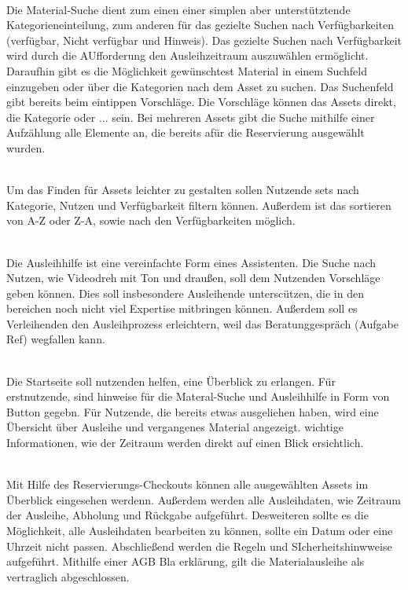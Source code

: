 {\sffamily\color{maincolor}{Ft-A-1 | Material-Suche }}\\
Die Material-Suche dient zum einen einer simplen aber unterstütztende
Kategorieneinteilung, zum anderen für das gezielte Suchen nach Verfügbarkeiten
(verfügbar, Nicht verfügbar und Hinweis). Das gezielte Suchen nach Verfügbarkeit
wird durch die AUfforderung den Ausleihzeitraum auszuwählen ermöglicht.
Daraufhin gibt es die Möglichkeit gewünschtest Material in einem Suchfeld
einzugeben oder über die Kategorien nach dem Asset zu suchen. Das Suchenfeld
gibt bereits beim eintippen Vorschläge. Die Vorschläge können das Assets direkt,
die Kategorie oder ... sein. Bei mehreren Assets gibt die Suche mithilfe einer
Aufzählung alle Elemente an, die bereits afür die Reservierung ausgewählt
wurden.

    {\sffamily\color{maincolor}{Ft-A-2 | Filtern und Sortieren }}\\
Um das Finden für Assets leichter zu gestalten sollen Nutzende sets nach
Kategorie, Nutzen und Verfügbarkeit filtern können. Außerdem ist das sortieren
von A-Z oder Z-A, sowie nach den Verfügbarkeiten möglich.

{\sffamily\color{maincolor}{Ft-A-3 | Ausleihhilfe  }}\\
Die Ausleihhilfe ist eine vereinfachte Form eines Assistenten. Die Suche nach
Nutzen, wie Videodreh mit Ton und draußen, soll dem Nutzenden Vorschläge geben
können. Dies soll insbesondere Ausleihende unterscützen, die in den bereichen
noch nicht viel Expertise mitbringen können. Außerdem soll es Verleihenden den
Ausleihprozess erleichtern, weil das Beratunggespräch (Aufgabe Ref) wegfallen
kann.

    {\sffamily\color{maincolor}{Ft-A-4 | Startseite }}\\
Die Startseite soll nutzenden helfen, eine  Überblick zu erlangen. Für
erstnutzende, sind hinweise für die Materal-Suche und Ausleihhilfe in Form von
Button gegebn. Für Nutzende, die bereits etwas ausgeliehen haben, wird eine
Übersicht über Ausleihe und vergangenes Material angezeigt. wichtige
Informationen, wie der Zeitraum werden direkt auf einen Blick ersichtlich.

    {\sffamily\color{maincolor}{Ft-A-5 | Reservierungs-Checkout }}\\
Mit Hilfe des Reservierungs-Checkouts können alle ausgewählten Assets im
Überblick eingesehen werdenn. Außerdem werden alle Ausleihdaten, wie Zeitraum
der Ausleihe, Abholung und Rückgabe aufgeführt. Desweiteren sollte es die
Möglichkeit, alle Ausleihdaten bearbeiten zu können, sollte ein Datum oder eine
Uhrzeit nicht passen. Abschließend werden die Regeln und SIcherheitshinwweise
aufgeführt. Mithilfe einer AGB Bla erklärung, gilt die Materialausleihe als
vertraglich abgeschlossen.


